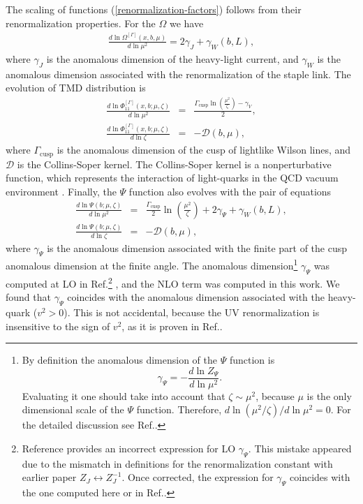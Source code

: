 \documentclass[aps,prl,twocolumn,secnumarabic,notitlepage,superscriptaddress,nofootinbib,tightenlines,floatfix,preprintnumbers]{revtex4-1}
\newcommand{\nn}{\nonumber}
\renewcommand{\(}{\left(}
\renewcommand{\)}{\right)}
\renewcommand{\[}{\left[}
\renewcommand{\]}{\right]}
\begin{document}
The scaling of functions (\ref{renormalization-factors}) follows from their renormalization properties. For the $\Omega$ we have
\begin{eqnarray}
\frac{d\ln \Omega^{[\Gamma]}(x,b,\mu)}{d\ln\mu^2} 
=2\gamma_J+\gamma_W(b,L),
\end{eqnarray}
where $\gamma_J$ is the anomalous dimension of the heavy-light current, and $\gamma_W$ is the anomalous dimension associated with the renormalization of the staple link. The evolution of TMD distribution is \cite{Aybat:2011zv, Scimemi:2017etj}
\begin{eqnarray}
\frac{d\ln \Phi_{11}^{[\Gamma]}(x,b;\mu,\zeta)}{d\ln\mu^2} 
&=&\frac{\Gamma_{\text{cusp}}\ln\(\frac{\mu^2}{\zeta}\)-\gamma_V}{2},
\\\label{evol:TMD-zeta}
\frac{d\ln \Phi_{11}^{[\Gamma]}(x,b;\mu,\zeta)}{d\ln\zeta} 
&=&-\mathcal{D}(b,\mu),
\end{eqnarray}
where $\Gamma_{\text{cusp}}$ is the anomalous dimension of the cusp of lightlike Wilson lines, and $\mathcal{D}$ is the Collins-Soper kernel. The Collins-Soper kernel is a nonperturbative function, which represents the interaction of light-quarks in the QCD vacuum environment \cite{Vladimirov:2020umg}. Finally, the $\Psi$ function also evolves with the pair of equations
\begin{eqnarray}\nn
\frac{d\ln \Psi(b;\mu,\zeta)}{d\ln\mu^2} 
&=&\frac{\Gamma_{\text{cusp}}}{2}\ln\(\frac{\mu^2}{\zeta}\)+2\gamma_\Psi
 +\gamma_W(b,L),
\\
\frac{d\ln \Psi(b;\mu,\zeta)}{d\ln\zeta} 
&=&-\mathcal{D}(b,\mu),
\end{eqnarray}
where $\gamma_\Psi$ is the anomalous dimension associated with the finite part of the cusp anomalous dimension at the finite angle. The anomalous dimension\footnote{
By definition the anomalous dimension of the $\Psi$ function is 
$$\gamma_\Psi=-\frac{d \ln Z_\Psi}{d\ln \mu^2}.$$
Evaluating it one should take into account that $\zeta\sim \mu^2$, because $\mu$ is the only dimensional scale of the $\Psi$ function. Therefore, $d\ln(\mu^2/\zeta)/d\ln \mu^2=0$. For the detailed discussion see Ref.\cite{Rodini:2022wic}.}
$\gamma_\Psi$ was computed at LO in Ref.\footnote{
Reference\cite{Vladimirov:2020ofp} provides an incorrect expression for LO $\gamma_\Psi$. This mistake appeared due to the mismatch in definitions for the renormalization constant with earlier paper $Z_J\leftrightarrow Z_J^{-1}$. Once corrected, the expression for $\gamma_\Psi$ coincides with the one computed here or in Ref.\cite{Rodini:2022wic}.} \cite{Vladimirov:2020ofp}, and the NLO term was computed in this work. We found that $\gamma_\Psi$ coincides with the anomalous dimension associated with the heavy-quark \cite{Becher:2009kw} ($v^2>0$). This is not accidental, because the UV renormalization is insensitive to the sign of $v^2$, as it is proven in Ref.\cite{Braun:2020ymy}.
\end{document}
